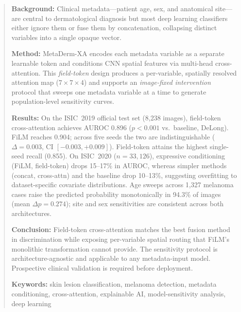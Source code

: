 \documentclass[12pt, a4paper]{article}
\begin{document}
\begin{abstract}
\noindent\textbf{Background:} Clinical metadata---patient age, sex, and anatomical site---are central to dermatological diagnosis but most deep learning classifiers either ignore them or fuse them by concatenation, collapsing distinct variables into a single opaque vector.

\noindent\textbf{Method:} MetaDerm-XA encodes each metadata variable as a separate learnable token and conditions CNN spatial features via multi-head cross-attention. This \emph{field-token} design produces a per-variable, spatially resolved attention map ($7{\times}7{\times}4$) and supports an \emph{image-fixed intervention} protocol that sweeps one metadata variable at a time to generate population-level sensitivity curves.

\noindent\textbf{Results:} On the ISIC~2019 official test set (8{,}238 images), field-token cross-attention achieves AUROC 0.896 ($p < 0.001$ vs.\ baseline, DeLong). FiLM reaches 0.904; across five seeds the two are indistinguishable ($\Delta = 0.003$, CI $[-0.003, +0.009]$). Field-token attains the highest single-seed recall (0.855). On ISIC~2020 ($n = 33{,}126$), expressive conditioning (FiLM, field-token) drops 15--17\% in AUROC, whereas simpler methods (concat, cross-attn) and the baseline drop 10--13\%, suggesting overfitting to dataset-specific covariate distributions. Age sweeps across 1{,}327 melanoma cases raise the predicted probability monotonically in 94.3\% of images (mean $\Delta p = 0.274$); site and sex sensitivities are consistent across both architectures.

\noindent\textbf{Conclusion:} Field-token cross-attention matches the best fusion method in discrimination while exposing per-variable spatial routing that FiLM's monolithic transformation cannot provide. The sensitivity protocol is architecture-agnostic and applicable to any metadata-input model. Prospective clinical validation is required before deployment.

\vspace{6pt}
\noindent\textbf{Keywords:} skin lesion classification, melanoma detection, metadata conditioning, cross-attention, explainable AI, model-sensitivity analysis, deep learning
\end{abstract}

\end{document}
